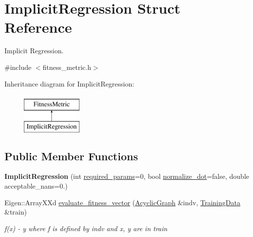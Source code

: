 \hypertarget{structImplicitRegression}{}\section{Implicit\+Regression Struct Reference}
\label{structImplicitRegression}


Implicit Regression.  




{\ttfamily \#include $<$fitness\+\_\+metric.\+h$>$}

Inheritance diagram for Implicit\+Regression\+:\begin{figure}[H]
\begin{center}
\leavevmode
\includegraphics[height=2.000000cm]{structImplicitRegression}
\end{center}
\end{figure}
\subsection*{Public Member Functions}
\begin{DoxyCompactItemize}
\item 
{\bfseries Implicit\+Regression} (int \hyperlink{structImplicitRegression_a5f25461dae2b71ad79eaf7fb91c86696}{required\+\_\+params}=0, bool \hyperlink{structImplicitRegression_a8d31df5b4020c1d26dc130e694b69ee4}{normalize\+\_\+dot}=false, double acceptable\+\_\+nans=0.)\hypertarget{structImplicitRegression_a5b70d19ebaa9e298a01a6eaf05b915f9}{}\label{structImplicitRegression_a5b70d19ebaa9e298a01a6eaf05b915f9}

\item 
Eigen\+::\+Array\+X\+Xd \hyperlink{structImplicitRegression_a8737c12d204ab5035347259f47018e5a}{evaluate\+\_\+fitness\+\_\+vector} (\hyperlink{classAcyclicGraph}{Acyclic\+Graph} \&indv, \hyperlink{structTrainingData}{Training\+Data} \&train)
\begin{DoxyCompactList}\small\item\em f(x) -\/ y where f is defined by indv and x, y are in train \end{DoxyCompactList}\end{DoxyCompactItemize}
